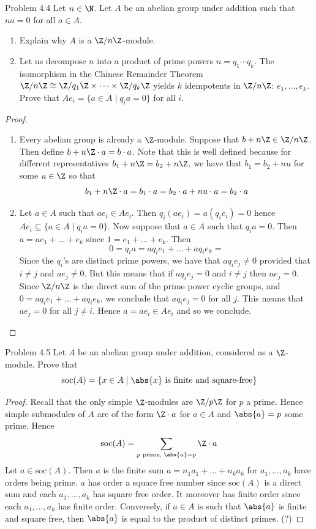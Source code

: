\documentclass[a4paper]{article}
\begin{document}
\begin{ex}{Problem 4.4}{} Let $n\in\N$. Let $A$ be an abelian group under addition such that $na=0$ for all $a\in A$. 
\begin{enumerate}
\item Explain why $A$ is a $\Z/n\Z$-module. 
\item Let us decompose $n$ into a product of prime powers $n=q_1\cdots q_k$. The isomorphism in the Chinese Remainder Theorem $\Z/n\Z\cong\Z/q_1\Z\times\cdots\times\Z/q_k\Z$ yields $k$ idempotents in $\Z/n\Z$: $e_1,\dots,e_k$. Prove that $Ae_i=\{a\in A\;|\;q_ia=0\}$ for all $i$. 
\end{enumerate} 
\begin{proof}~\\
\begin{enumerate}
\item Every abelian group is already a $\Z$-module. Suppose that $b+n\Z\in\Z/n\Z$. Then define $b+n\Z\cdot a=b\cdot a$. Note that this is well defined because for different representatives $b_1+n\Z=b_2+n\Z$, we have that $b_1=b_2+nu$ for some $u\in\Z$ so that $$b_1+n\Z\cdot a=b_1\cdot a=b_2\cdot a+nu\cdot a=b_2\cdot a$$
\item Let $a\in A$ such that $ae_i\in Ae_i$. Then $q_i(ae_i)=a(q_ie_i)=0$ hence $Ae_i\subseteq\{a\in A\;|\;q_ia=0\}$. Now suppose that $a\in A$ such that $q_ia=0$. Then $a=ae_1+\dots+e_k$ since $1=e_1+\dots+e_k$. Then $$0=q_ia=aq_ie_1+\dots+aq_ie_k=$$ Since the $q_i$'s are distinct prime powers, we have that $aq_ie_j\neq 0$ provided that $i\neq j$ and $ae_j\neq 0$. But this means that if $aq_ie_j=0$ and $i\neq j$ then $ae_j=0$. Since $\Z/n\Z$ is the direct sum of the prime power cyclic groups, and $0=aq_ie_1+\dots+aq_ie_k$, we conclude that $aq_ie_j=0$ for all $j$. This means that $ae_j=0$ for all $j\neq i$. Hence $a=ae_i\in Ae_i$ and so we conclude. 
\end{enumerate}
\end{proof}
\end{ex}

\begin{ex}{Problem 4.5}{} Let $A$ be an abelian group under addition, considered as a $\Z$-module. Prove that $$\text{soc}(A)=\{x\in A\;|\;\abs{x}\text{ is finite and square-free}\}$$ 
\begin{proof}
Recall that the only simple $\Z$-modules are $\Z/p\Z$ for $p$ a prime. Hence simple submodules of $A$ are of the form $\Z\cdot a$ for $a\in A$ and $\abs{a}=p$ some prime. Hence $$\text{soc}(A)=\sum_{p\text{ prime, }\abs{a}=p}\Z\cdot a$$ Let $a\in\text{soc}(A)$. Then $a$ is the finite sum $a=n_1a_1+\dots+n_ka_k$ for $a_1,\dots,a_k$ have orders being prime. $a$ has order a square free number since $\text{soc}(A)$ is a direct sum and each $a_1,\dots,a_k$ has square free order. It moreover has finite order since each $a_1,\dots,a_k$ has finite order. Conversely, if $a\in A$ is such that $\abs{a}$ is finite and square free, then $\abs{a}$ is equal to the product of distinct primes. (?)
\end{proof}
\end{ex}
\end{document}
